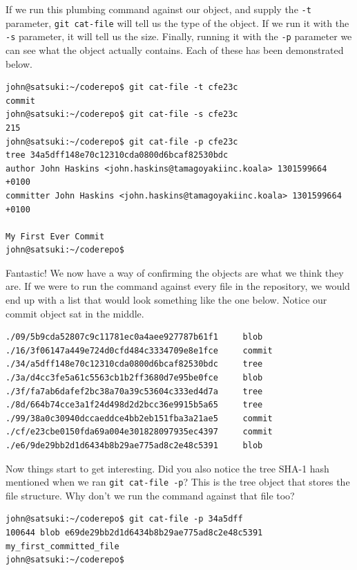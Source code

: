 If we run this plumbing command against our object, and supply the \texttt{-t} parameter, \texttt{git cat-file} will tell us the type of the object.  If we run it with the \texttt{-s} parameter, it will tell us the size.  Finally, running it with the \texttt{-p} parameter we can see what the object actually contains.  Each of these has been demonstrated below.

\begin{Verbatim}[frame=leftline,framerule=1mm,fontsize=\relsize{-3}]
john@satsuki:~/coderepo$ git cat-file -t cfe23c
commit
john@satsuki:~/coderepo$ git cat-file -s cfe23c
215
john@satsuki:~/coderepo$ git cat-file -p cfe23c
tree 34a5dff148e70c12310cda0800d6bcaf82530bdc
author John Haskins <john.haskins@tamagoyakiinc.koala> 1301599664 +0100
committer John Haskins <john.haskins@tamagoyakiinc.koala> 1301599664 +0100

My First Ever Commit
john@satsuki:~/coderepo$ 
\end{Verbatim}

Fantastic!  We now have a way of confirming the objects are what we think they are.  If we were to run the command against every file in the repository, we would end up with a list that would look something like the one below.  Notice our commit object sat in the middle.

\begin{Verbatim}[frame=leftline,framerule=1mm,fontsize=\relsize{-3}]
./09/5b9cda52807c9c11781ec0a4aee927787b61f1		blob
./16/3f06147a449e724d0cfd484c3334709e8e1fce     commit
./34/a5dff148e70c12310cda0800d6bcaf82530bdc		tree
./3a/d4cc3fe5a61c5563cb1b2ff3680d7e95be0fce		blob
./3f/fa7ab6dafef2bc38a70a39c53604c333ed4d7a		tree
./8d/664b74cce3a1f24d498d2d2bcc36e9915b5a65		tree
./99/38a0c30940dccaeddce4bb2eb151fba3a21ae5     commit
./cf/e23cbe0150fda69a004e301828097935ec4397     commit
./e6/9de29bb2d1d6434b8b29ae775ad8c2e48c5391		blob
\end{Verbatim}

Now things start to get interesting.  Did you also notice the tree SHA-1 hash mentioned when we ran \texttt{git cat-file -p}?  This is the tree object that stores the file structure.  Why don't we run the command against that file too?

\begin{Verbatim}[frame=leftline,framerule=1mm,fontsize=\relsize{-3}]
john@satsuki:~/coderepo$ git cat-file -p 34a5dff
100644 blob e69de29bb2d1d6434b8b29ae775ad8c2e48c5391	my_first_committed_file
john@satsuki:~/coderepo$ 
\end{Verbatim}

